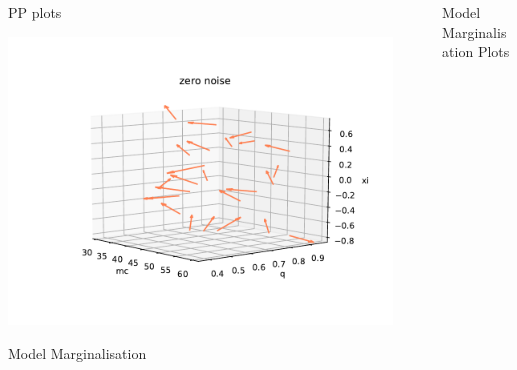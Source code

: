 \documentclass[serif]{beamer}
\begin{document}
\begin{frame}{}
\begin{columns}
\begin{column}[T]{0.35\textwidth}
\begin{block}{PP plots}
\begin{center}
   \includegraphics[scale=1.5]{Images/Sample_vectorplot}
   \end{center}
  \vspace{-3.5em}



\end{block}




\vspace{1em}

\begin{block}{Model Marginalisation}





\end{block}


\vfill
\end{column}
~
\begin{column}[T]{0.3\textwidth}


\begin{block}{Model Marginalisation Plots}

\end{block}


\end{column}
\end{columns}
\end{frame}
\end{document}
